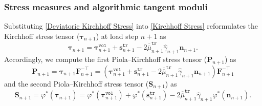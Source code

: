 \documentclass[preprint,11pt]{elsarticle}
\theoremstyle{definition}
\begin{document}
\subsubsection{Stress measures and algorithmic tangent moduli}

Substituting \eqref{Deviatoric Kirchhoff Stress} into \eqref{Kirchhoff Stress} reformulates the Kirchhoff stress tensor ($\boldsymbol{\tau}_{n+1}$) at load step $n+1$ as
\begin{equation*}
    \boldsymbol{\tau}_{n+1} = \boldsymbol{\tau}_{n+1}^\texttt{vol}
    + \mathbf{s}_{n+1}^\texttt{tr}
    - 2 \overline{\overline{\mu}}_{n+1}^\texttt{tr} \widehat{\gamma}_{n+1} \mathbf{n}_{n+1}.
\end{equation*}
Accordingly, we compute the first Piola--Kirchhoff stress tensor ($\mathbf{P}_{n+1}$) as
\begin{equation} \label{First PK Stress}
    \mathbf{P}_{n+1} = \boldsymbol{\tau}_{n+1} \mathbf{F}_{n+1}^{-\top} = \left( \boldsymbol{\tau}_{n+1}^\texttt{vol}
    + \mathbf{s}_{n+1}^\texttt{tr}
    - 2 \overline{\overline{\mu}}_{n+1}^\texttt{tr} \widehat{\gamma}_{n+1} \mathbf{n}_{n+1} \right) \mathbf{F}_{n+1}^{-\top}
\end{equation}
and the second Piola--Kirchhoff stress tensor ($\mathbf{S}_{n+1}$) as
\begin{equation} \label{Second PK Stress}
    \mathbf{S}_{n+1} = \varphi^*(\boldsymbol{\tau}_{n+1})
    = \varphi^*(\boldsymbol{\tau}_{n+1}^\texttt{vol})
    + \varphi^*(\mathbf{s}_{n+1}^\texttt{tr})
    - 2 \overline{\overline{\mu}}_{n+1}^\texttt{tr} \widehat{\gamma}_{n+1} \varphi^*(\mathbf{n}_{n+1}).
\end{equation}
\end{document}
